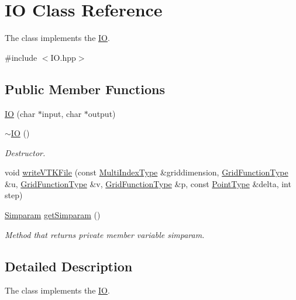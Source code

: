 \hypertarget{class_i_o}{\section{I\-O Class Reference}
\label{d8/d24/class_i_o}
}


The class implements the \hyperlink{class_i_o}{I\-O}.  




{\ttfamily \#include $<$I\-O.\-hpp$>$}

\subsection*{Public Member Functions}
\begin{DoxyCompactItemize}
\item 
\hyperlink{class_i_o_ac100fd32b66e2c0e1ad53fdcd15a1b99}{I\-O} (char $\ast$input, char $\ast$output)
\item 
\hyperlink{class_i_o_a44861ff225d351615179f0f24cb8d7f6}{$\sim$\-I\-O} ()
\begin{DoxyCompactList}\small\item\em Destructor. \end{DoxyCompactList}\item 
void \hyperlink{class_i_o_a8bb88500f3553e47d3cbf5e600708bae}{write\-V\-T\-K\-File} (const \hyperlink{typedef_8h_a1dd5febfa1b04cfb02de926235bc9e58}{Multi\-Index\-Type} \&griddimension, \hyperlink{typedef_8h_a8998e93841a5f5b58312b7937c5b6164}{Grid\-Function\-Type} \&u, \hyperlink{typedef_8h_a8998e93841a5f5b58312b7937c5b6164}{Grid\-Function\-Type} \&v, \hyperlink{typedef_8h_a8998e93841a5f5b58312b7937c5b6164}{Grid\-Function\-Type} \&p, const \hyperlink{typedef_8h_af09038ac7e336d283bb9694a57c0572f}{Point\-Type} \&delta, int step)
\item 
\hyperlink{struct_simparam}{Simparam} \hyperlink{class_i_o_a3933f286e7fe830690785f8528d325d9}{get\-Simparam} ()
\begin{DoxyCompactList}\small\item\em Method that returns private member variable simparam. \end{DoxyCompactList}\end{DoxyCompactItemize}


\subsection{Detailed Description}
The class implements the \hyperlink{class_i_o}{I\-O}. 

